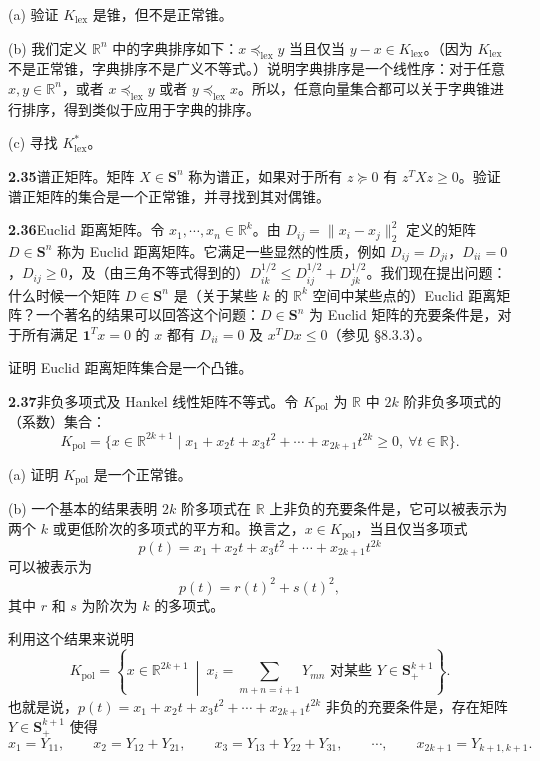 \documentclass[UTF8,12pt,a4paper,fontset=fandol]{ctexart}
\begin{document}
\noindent(a) 验证 $K_{\mathrm{lex}}$ 是锥，但不是正常锥。

\noindent(b) 我们定义 $\mathbb{R}^n$ 中的字典排序如下：$x\preceq_{\mathrm{lex}}y$ 当且仅当 $y-x\in K_{\mathrm{lex}}$。（因为 $K_{\mathrm{lex}}$ 不是正常锥，字典排序不是广义不等式。）说明字典排序是一个线性序：对于任意 $x,y\in\mathbb{R}^n$，或者 $x\preceq_{\mathrm{lex}}y$ 或者 $y\preceq_{\mathrm{lex}}x$。所以，任意向量集合都可以关于字典锥进行排序，得到类似于应用于字典的排序。

\noindent(c) 寻找 $K_{\mathrm{lex}}^*$。

\noindent\textbf{2.35}\quad 谱正矩阵。矩阵 $X\in\mathbf{S}^n$ 称为谱正，如果对于所有 $z\succeq0$ 有 $z^TXz\ge0$。验证谱正矩阵的集合是一个正常锥，并寻找到其对偶锥。

\noindent\textbf{2.36}\quad Euclid 距离矩阵。令 $x_1,\cdots,x_n\in\mathbb{R}^k$。由 $D_{ij}=\|x_i-x_j\|_2^2$ 定义的矩阵 $D\in\mathbf{S}^n$ 称为 Euclid 距离矩阵。它满足一些显然的性质，例如 $D_{ij}=D_{ji}$，$D_{ii}=0$，$D_{ij}\ge0$，及（由三角不等式得到的）$D_{ik}^{1/2}\le D_{ij}^{1/2}+D_{jk}^{1/2}$。我们现在提出问题：什么时候一个矩阵 $D\in\mathbf{S}^n$ 是（关于某些 $k$ 的 $\mathbb{R}^k$ 空间中某些点的）Euclid 距离矩阵？一个著名的结果可以回答这个问题：$D\in\mathbf{S}^n$ 为 Euclid 矩阵的充要条件是，对于所有满足 $\mathbf{1}^Tx=0$ 的 $x$ 都有 $D_{ii}=0$ 及 $x^TDx\le0$（参见 \S8.3.3）。

证明 Euclid 距离矩阵集合是一个凸锥。

\noindent\textbf{2.37}\quad 非负多项式及 Hankel 线性矩阵不等式。令 $K_{\mathrm{pol}}$ 为 $\mathbb{R}$ 中 $2k$ 阶非负多项式的（系数）集合：
\[
  K_{\mathrm{pol}}=\{x\in\mathbb{R}^{2k+1}\mid x_1+x_2t+x_3t^2+\cdots+x_{2k+1}t^{2k}\ge0,\ \forall t\in\mathbb{R}\}.
\]

\noindent(a) 证明 $K_{\mathrm{pol}}$ 是一个正常锥。

\noindent(b) 一个基本的结果表明 $2k$ 阶多项式在 $\mathbb{R}$ 上非负的充要条件是，它可以被表示为两个 $k$ 或更低阶次的多项式的平方和。换言之，$x\in K_{\mathrm{pol}}$，当且仅当多项式
\[
  p(t)=x_1+x_2t+x_3t^2+\cdots+x_{2k+1}t^{2k}
\]
可以被表示为
\[
  p(t)=r(t)^2+s(t)^2,
\]
其中 $r$ 和 $s$ 为阶次为 $k$ 的多项式。

利用这个结果来说明
\[
  K_{\mathrm{pol}}=
  \left\{x\in\mathbb{R}^{2k+1}\ \middle|\ x_i=\sum_{m+n=i+1}Y_{mn}\text{ 对某些 }Y\in\mathbf{S}_+^{k+1}\right\}.
\]
也就是说，$p(t)=x_1+x_2t+x_3t^2+\cdots+x_{2k+1}t^{2k}$ 非负的充要条件是，存在矩阵 $Y\in\mathbf{S}_+^{k+1}$ 使得
\[
  x_1=Y_{11},\qquad
  x_2=Y_{12}+Y_{21},\qquad
  x_3=Y_{13}+Y_{22}+Y_{31},\qquad \cdots,\qquad
  x_{2k+1}=Y_{k+1,k+1}.
\]
\end{document}
